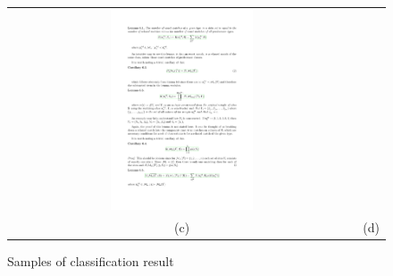 \documentclass[12pt]{IEEEtran}
\begin{document}
\begin{figure}[h]
\begin{tabular}{|c|c|}
 \includegraphics[width=0.42\textwidth]{result4.png} \\
 (c)  &(d)  \\
 \hline
 \end{tabular} 
 \caption{Samples of classification result }
 \label{exp_result}
\end{figure}
\end{document}
